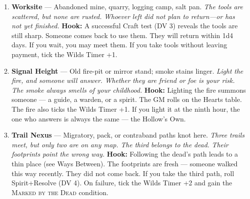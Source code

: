 \begin{enumerate}
\item[Q] \textbf{Worksite} --- Abandoned mine, quarry, logging camp, salt pan.
  \hfill \textit{The tools are scattered, but none are rusted. Whoever left did not plan to return---or has not yet finished.}
  \textbf{Hook:} A successful Craft test (DV 3) reveals the tools are still sharp. Someone comes back to use them. They will return within 1d4 days. If you wait, you may meet them. If you take tools without leaving payment, tick the Wilds Timer +1.
  
\item[K] \textbf{Signal Height} --- Old fire-pit or mirror stand; smoke stains linger.
  \hfill \textit{Light the fire, and someone will answer. Whether they are friend or foe is your risk. The smoke always smells of your childhood.}
  \textbf{Hook:} Lighting the fire summons someone --- a guide, a warden, or a spirit. The GM rolls on the Hearts table. The fire also ticks the Wilds Timer +1. If you light it at the ninth hour, the one who answers is always the same --- the Hollow's Own.
  
\item[A] \textbf{Trail Nexus} --- Migratory, pack, or contraband paths knot here.
  \hfill \textit{Three trails meet, but only two are on any map. The third belongs to the dead. Their footprints point the wrong way.}
  \textbf{Hook:} Following the dead's path leads to a thin place (see Ways Between). The footprints are fresh --- someone walked this way recently. They did not come back. If you take the third path, roll Spirit+Resolve (DV 4). On failure, tick the Wilds Timer +2 and gain the \textsc{Marked by the Dead} condition.
\end{enumerate}

